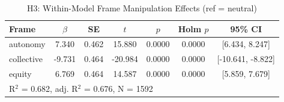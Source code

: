 \begin{table}[ht]
\centering
\caption{H3: Within-Model Frame Manipulation Effects (ref = neutral)}
\label{tab:h3-frame-manipulation}
\begin{tabular}{lcccccc}
\toprule
Frame & $\beta$ & SE & $t$ & $p$ & Holm $p$ & 95\% CI \\
\midrule
autonomy & 7.340 & 0.462 & 15.880 & 0.0000 & 0.0000 & [6.434, 8.247] \\
collective & -9.731 & 0.464 & -20.984 & 0.0000 & 0.0000 & [-10.641, -8.822] \\
equity & 6.769 & 0.464 & 14.587 & 0.0000 & 0.0000 & [5.859, 7.679] \\
\midrule
\multicolumn{7}{l}{R$^2$ = 0.682, adj. R$^2$ = 0.676, N = 1592} \\
\bottomrule
\end{tabular}
\end{table}
